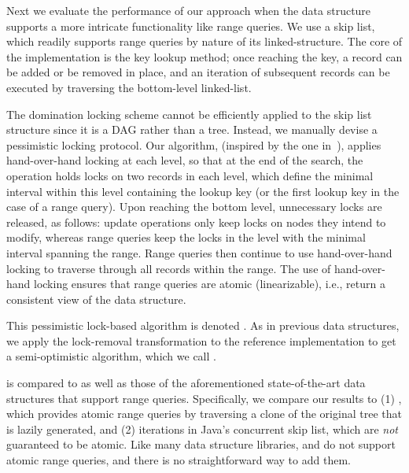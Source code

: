 Next we evaluate the performance of our approach when the data
structure supports a more intricate functionality like range queries.
We use a skip list, which readily supports range queries by
nature of its linked-structure. The core of the implementation is the key lookup
method; once reaching the key, a record can be added or be removed in place, and
an iteration of subsequent records can be executed by traversing
the bottom-level linked-list.

The domination locking scheme cannot be efficiently applied to the skip list
structure since it is a DAG rather than a tree. Instead, we
manually devise a pessimistic locking protocol. Our
algorithm, (inspired by the one in~\cite{HerlihyS2008}), applies
hand-over-hand locking at each level, so that at the end of the search, the
operation holds locks on two records in each level, which define the minimal interval within this level
containing the lookup key (or the first lookup key in the case of a range query). Upon
reaching the bottom level, unnecessary locks are released, as follows: update operations only keep
locks on nodes they intend to modify, whereas
range
queries keep the locks in the level with the minimal interval spanning the
range. Range queries then continue to use hand-over-hand locking to traverse through all records
within the range. The use of hand-over-hand locking ensures that range queries are atomic
(linearizable), i.e., return a consistent view of the data structure.

This pessimistic lock-based algorithm is denoted \domSkiplist.
As in previous data structures, we  apply the lock-removal transformation to the
reference implementation to get a semi-optimistic algorithm, which we call
\autoSkiplist.

\autoSkiplist is compared to \domSkiplist as well as those of the aforementioned
state-of-the-art data structures that support range queries. Specifically,
we compare our results to (1)
\bronson, which provides atomic range queries by traversing a clone of the
original tree that is lazily generated, and (2)
iterations in Java's concurrent skip list, which are \emph{not}
guaranteed to be atomic. Like many data structure libraries, \danaTree and \danaAVL
do not support atomic range queries, and
there is no straightforward way to add them.

